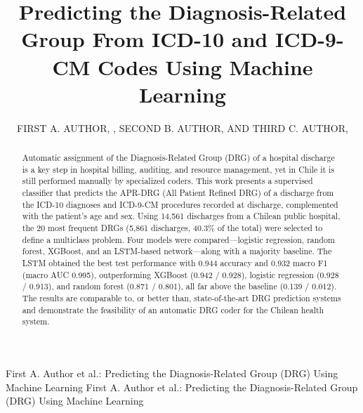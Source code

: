 \documentclass{ieeeaccess}
\begin{document}

\title{Predicting the Diagnosis-Related Group From ICD-10 and ICD-9-CM Codes Using Machine Learning}
\author{\uppercase{First A. Author}, ,
\uppercase{Second B. Author}, AND \uppercase{Third C. Author},
}

\address[1]{School of Informatics, Universidad Andrés Bello, Santiago, Chile (e-mail: author1@unab.cl)}
\address[2]{School of Informatics, Universidad Andrés Bello, Santiago, Chile (e-mail: author2@unab.cl)}
\address[3]{School of Informatics, Universidad Andrés Bello, Santiago, Chile (e-mail: author3@unab.cl)}

\markboth
{First A. Author et al.: Predicting the Diagnosis-Related Group (DRG) Using Machine Learning}
{First A. Author et al.: Predicting the Diagnosis-Related Group (DRG) Using Machine Learning}



\begin{abstract}
Automatic assignment of the Diagnosis-Related Group (DRG) of a hospital discharge is a key step in hospital billing, auditing, and resource management, yet in Chile it is still performed manually by specialized coders. This work presents a supervised classifier that predicts the APR-DRG (All Patient Refined DRG) of a discharge from the ICD-10 diagnoses and ICD-9-CM procedures recorded at discharge, complemented with the patient's age and sex. Using 14,561 discharges from a Chilean public hospital, the 20 most frequent DRGs (5,861 discharges, 40.3\% of the total) were selected to define a multiclass problem. Four models were compared---logistic regression, random forest, XGBoost, and an LSTM-based network---along with a majority baseline. The LSTM obtained the best test performance with 0.944 accuracy and 0.932 macro F1 (macro AUC 0.995), outperforming XGBoost (0.942 / 0.928), logistic regression (0.928 / 0.913), and random forest (0.871 / 0.801), all far above the baseline (0.139 / 0.012). The results are comparable to, or better than, state-of-the-art DRG prediction systems and demonstrate the feasibility of an automatic DRG coder for the Chilean health system.
\end{abstract}
\end{document}
